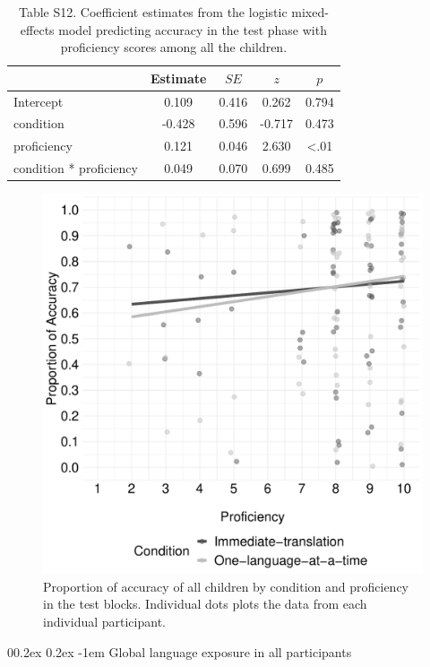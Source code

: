 \documentclass[
  man,floatsintext]{apa7}
\makeatletter
\let\oldparagraph\paragraph
\renewcommand{\paragraph}[1]{\oldparagraph{#1}\mbox{}}
\renewcommand{\paragraph}{\@startsection{paragraph}{4}{\parindent}%
  {0\baselineskip \@plus 0.2ex \@minus 0.2ex}%
  {-1em}%
  {\normalfont\normalsize\bfseries\itshape\typesectitle}}
\renewcommand{\paragraph}{\@startsection{paragraph}{4}{\parindent}%
  {0\baselineskip \@plus 0.2ex \@minus 0.2ex}%
  {-1em}%
  {\normalfont\normalsize\bfseries\typesectitle}}
\makeatother
\begin{document}
\begin{table}[H]

\begin{center}
\begin{threeparttable}

\caption{\label{tab:unnamed-chunk-36}Table S12. Coefficient estimates from the logistic mixed-effects model predicting accuracy in the test phase with proficiency scores among all the children.}

\begin{tabular}{m{8cm}cccc}
\toprule
 & Estimate & $SE$ & $z$ & $p$\\
\midrule
Intercept & 0.109 & 0.416 & 0.262 & 0.794\\
condition & -0.428 & 0.596 & -0.717 & 0.473\\
proficiency & 0.121 & 0.046 & 2.630 & <.01\\
condition * proficiency & 0.049 & 0.070 & 0.699 & 0.485\\
\bottomrule
\end{tabular}

\end{threeparttable}
\end{center}

\end{table}

\begin{figure}

{\centering \includegraphics[width=0.5\linewidth]{TabletSwitch_supplemental_files/figure-latex/FigureS8-1} 

}

\caption{Proportion of accuracy of all children by condition and proficiency in the test blocks. Individual dots plots the data from each individual participant.}\label{fig:FigureS8}
\end{figure}

\hypertarget{global-language-exposure-in-all-participants}{%
\paragraph{Global language exposure in all participants}\label{global-language-exposure-in-all-participants}}
\end{document}
